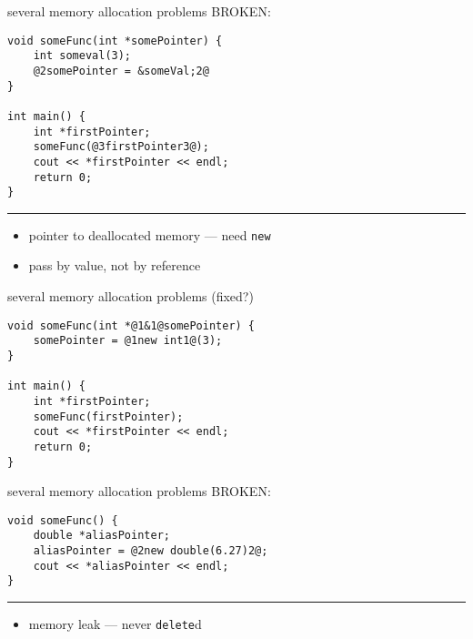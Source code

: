 \begin{frame}[fragile,label=someMemAllocProbs]{several memory allocation problems}
BROKEN:
\begin{lstlisting}
void someFunc(int *somePointer) {
    int someval(3);
    @2somePointer = &someVal;2@
}

int main() {
    int *firstPointer;
    someFunc(@3firstPointer3@);
    cout << *firstPointer << endl;
    return 0;
}
\end{lstlisting}
\hrule
\begin{itemize}
\item<2-> pointer to deallocated memory --- need \texttt{new}
\item<3-> pass by value, not by reference
\end{itemize}
\end{frame}

\begin{frame}[fragile,label=someMemAllocProbsFixed]{several memory allocation problems (fixed?)}
\begin{lstlisting}
void someFunc(int *@1&1@somePointer) {
    somePointer = @1new int1@(3);
}

int main() {
    int *firstPointer;
    someFunc(firstPointer);
    cout << *firstPointer << endl;
    return 0;
}
\end{lstlisting}
\end{frame}

\begin{frame}[fragile,label=someMemAllocProbsB]{several memory allocation problems}
BROKEN:
\begin{lstlisting}
void someFunc() {
    double *aliasPointer;
    aliasPointer = @2new double(6.27)2@;
    cout << *aliasPointer << endl;
}
\end{lstlisting}
\hrule
\begin{itemize}
\item<2-> memory leak --- never \texttt{delete}d
\end{itemize}
\end{frame}

